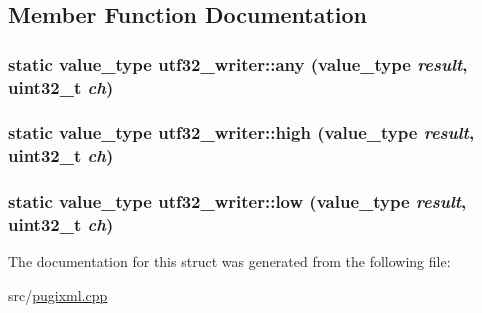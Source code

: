 \subsection{Member Function Documentation}
\hypertarget{structutf32__writer_aa94aaa4a13e755942e7da70ea7700d3e}{
\subsubsection[{any}]{\setlength{\rightskip}{0pt plus 5cm}static {\bf value\_\-type} utf32\_\-writer::any ({\bf value\_\-type} {\em result}, \/  uint32\_\-t {\em ch})}}
\label{structutf32__writer_aa94aaa4a13e755942e7da70ea7700d3e}
\hypertarget{structutf32__writer_a3f86d996cde3ed7cab5c31930b67c9f1}{
\subsubsection[{high}]{\setlength{\rightskip}{0pt plus 5cm}static {\bf value\_\-type} utf32\_\-writer::high ({\bf value\_\-type} {\em result}, \/  uint32\_\-t {\em ch})}}
\label{structutf32__writer_a3f86d996cde3ed7cab5c31930b67c9f1}
\hypertarget{structutf32__writer_a06e1b65906f7355ea54a622248095bc7}{
\subsubsection[{low}]{\setlength{\rightskip}{0pt plus 5cm}static {\bf value\_\-type} utf32\_\-writer::low ({\bf value\_\-type} {\em result}, \/  uint32\_\-t {\em ch})}}
\label{structutf32__writer_a06e1b65906f7355ea54a622248095bc7}


The documentation for this struct was generated from the following file:\begin{DoxyCompactItemize}
\item 
src/\hyperlink{pugixml_8cpp}{pugixml.cpp}\end{DoxyCompactItemize}
